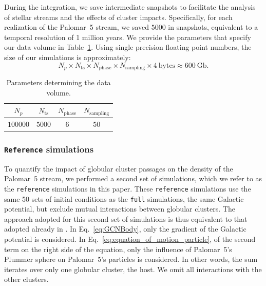 \documentclass{aa}
\begin{document}
      During the integration, we save intermediate snapshots to facilitate the analysis of stellar streams and the effects of cluster impacts. Specifically, for each realization of the Palomar~5 stream, we saved $5000$ in snapshots, equivalent to a temporal resolution of 1 million years. We provide the parameters that specify our data volume in Table~\ref{tab:data_volume}. Using single precision floating point numbers, the size of our simulations is approximately:
    \begin{equation} \label{eq:data_volume_estimate}
      N_p \times N_{\textrm{ts}}\times N_{\textrm{phase}}\times N_{\textrm{sampling}} \times 4~\textrm{bytes}\approx 600~\textrm{Gb}.
    \end{equation}

    \begin{table}[h]
      \centering
      \caption{Parameters determining the data volume.}
      \label{tab:data_volume}
      \begin{tabular}{|c|c|c|c|}
          \hline
          $N_p$ & $N_{\textrm{ts}}$ & $N_{\textrm{phase}}$ & $N_{\textrm{sampling}}$ \\
          \hline
          $100000$ & $5000$ & $6$ & $50$ \\
          \hline
      \end{tabular}
    \end{table}

  \subsubsection{ \texttt{Reference} simulations}

    To quantify the impact of globular cluster passages on the density of the Palomar~5 stream, we performed a second set of simulations, which we refer to as the \texttt{reference} simulations in this paper.  These \texttt{reference} simulations use the same 50 sets of initial conditions as the \texttt{full} simulations, the same Galactic potential, but exclude mutual interactions between globular clusters. The approach adopted for this second set of simulations is thus equivalent to that adopted already in \citet{2023A&A...673A..44F}. In Eq.~\ref{eq:GCNBody}, only the gradient of the Galactic potential is considered. In Eq.~\ref{eq:equation_of_motion_particle}, of the second term on the right side of the equation, only the influence of Palomar~5's Plummer sphere on Palomar~5's particles is considered. In other words, the sum iterates over only one globular cluster, the host. We omit all interactions with the other clusters.
\end{document}
